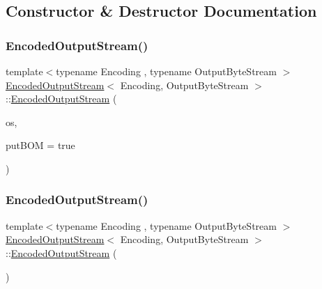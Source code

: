 \subsection{Constructor \& Destructor Documentation}
\mbox{\label{classEncodedOutputStream_ad3360c613a30a6a15526ae9ad63bd004}} 
\subsubsection{\texorpdfstring{Encoded\+Output\+Stream()}{EncodedOutputStream()}\hspace{0.1cm}{\footnotesize\ttfamily [1/2]}}
{\footnotesize\ttfamily template$<$typename Encoding , typename Output\+Byte\+Stream $>$ \\
\hyperlink{classEncodedOutputStream}{Encoded\+Output\+Stream}$<$ Encoding, Output\+Byte\+Stream $>$\+::\hyperlink{classEncodedOutputStream}{Encoded\+Output\+Stream} (\begin{DoxyParamCaption}\item[{Output\+Byte\+Stream \&}]{os,  }\item[{bool}]{put\+B\+OM = {\ttfamily true} }\end{DoxyParamCaption})\hspace{0.3cm}{\ttfamily [inline]}}

\mbox{\label{classEncodedOutputStream_a247a71781f8ba29b7f8e7182bf398c7c}} 
\subsubsection{\texorpdfstring{Encoded\+Output\+Stream()}{EncodedOutputStream()}\hspace{0.1cm}{\footnotesize\ttfamily [2/2]}}
{\footnotesize\ttfamily template$<$typename Encoding , typename Output\+Byte\+Stream $>$ \\
\hyperlink{classEncodedOutputStream}{Encoded\+Output\+Stream}$<$ Encoding, Output\+Byte\+Stream $>$\+::\hyperlink{classEncodedOutputStream}{Encoded\+Output\+Stream} (\begin{DoxyParamCaption}\item[{const \hyperlink{classEncodedOutputStream}{Encoded\+Output\+Stream}$<$ Encoding, Output\+Byte\+Stream $>$ \&}]{ }\end{DoxyParamCaption})\hspace{0.3cm}{\ttfamily [private]}}



